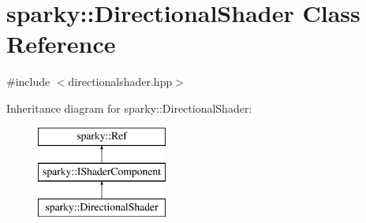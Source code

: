 \hypertarget{classsparky_1_1_directional_shader}{}\section{sparky\+:\+:Directional\+Shader Class Reference}
\label{classsparky_1_1_directional_shader}


{\ttfamily \#include $<$directionalshader.\+hpp$>$}

Inheritance diagram for sparky\+:\+:Directional\+Shader\+:\begin{figure}[H]
\begin{center}
\leavevmode
\includegraphics[height=3.000000cm]{classsparky_1_1_directional_shader}
\end{center}
\end{figure}

